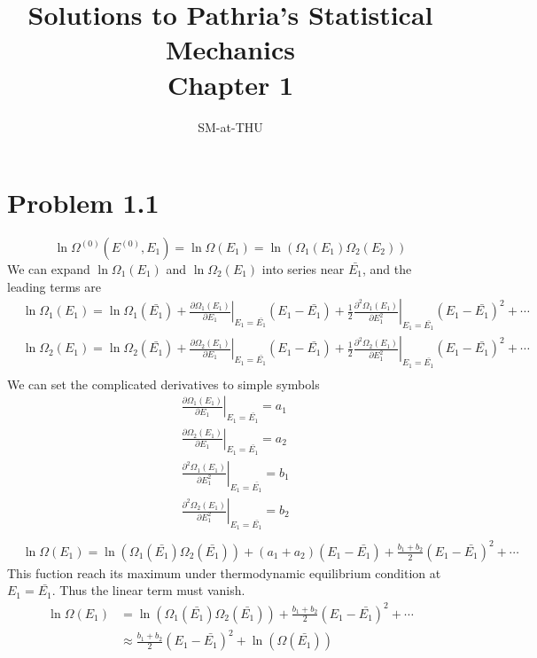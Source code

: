 \documentclass{article}
\author{SM-at-THU}
\title{\bf{Solutions to Pathria's Statistical Mechanics}\\Chapter 1}
\begin{document}
\maketitle
\section*{Problem 1.1}
\begin{equation}
\ln\Omega^{(0)}(E^{(0)},E_1)=\ln\Omega(E_1)=\ln(\Omega_1(E_1)\Omega_2(E_2))
\end{equation}
We can expand $\ln\Omega_1(E_1)$ and $\ln\Omega_2(E_1)$ into series near $\bar{E_1}$, and the leading terms are
\begin{align}
&\ln\Omega_1(E_1)=\ln\Omega_1(\bar{E_1})+\left. \frac{\partial \Omega_1(E_1)}{\partial E_1}\right|_{E_1=\bar{E_1}}(E_1-\bar{E_1})+\frac{1}{2}\left. \frac{\partial^2 \Omega_1(E_1)}{\partial E_1^2}\right|_{E_1=\bar{E_1}}(E_1-\bar{E_1})^2+\cdots\\
&\ln\Omega_2(E_1)=\ln\Omega_2(\bar{E_1})+\left. \frac{\partial \Omega_2(E_1)}{\partial E_1}\right|_{E_1=\bar{E_1}}(E_1-\bar{E_1})+\frac{1}{2}\left. \frac{\partial^2 \Omega_2(E_1)}{\partial E_1^2}\right|_{E_1=\bar{E_1}}(E_1-\bar{E_1})^2+\cdots\\
\end{align}
We can set the complicated derivatives to simple symbols
\begin{align}
&\left. \frac{\partial \Omega_1(E_1)}{\partial E_1}\right|_{E_1=\bar{E_1}}=a_1\\
&\left. \frac{\partial \Omega_2(E_1)}{\partial E_1}\right|_{E_1=\bar{E_1}}=a_2\\
&\left. \frac{\partial^2 \Omega_1(E_1)}{\partial E_1^2}\right|_{E_1=\bar{E_1}}=b_1\\
&\left. \frac{\partial^2 \Omega_2(E_1)}{\partial E_1^2}\right|_{E_1=\bar{E_1}}=b_2\\
\end{align}
\begin{align}
&\ln\Omega(E_1)=\ln(\Omega_1(\bar{E_1})\Omega_2(\bar{E_1}))+(a_1+a_2)(E_1-\bar{E_1})+\frac{b_1+b_2}{2}(E_1-\bar{E_1})^2+\cdots
\end{align}
This fuction reach its maximum under thermodynamic equilibrium condition at $E_1=\bar{E_1}$. Thus the linear term must vanish.
\begin{align}
\ln\Omega(E_1)&=\ln(\Omega_1(\bar{E_1})\Omega_2(\bar{E_1}))+\frac{b_1+b_2}{2}(E_1-\bar{E_1})^2+\cdots\\
&\approx \frac{b_1+b_2}{2}(E_1-\bar{E_1})^2+\ln(\Omega(\bar{E_1}))\\
\end{align}
\end{document}
